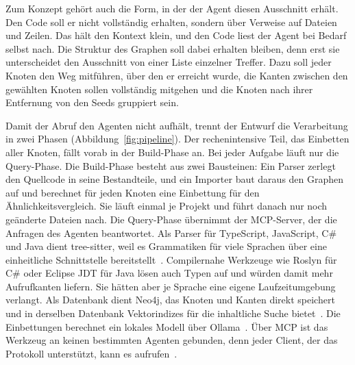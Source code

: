 Zum Konzept gehört auch die Form, in der der Agent diesen Ausschnitt erhält. Den Code soll er nicht vollständig erhalten, sondern über Verweise auf Dateien und Zeilen. Das hält den Kontext klein, und den Code liest der Agent bei Bedarf selbst nach. Die Struktur des Graphen soll dabei erhalten bleiben, denn erst sie unterscheidet den Ausschnitt von einer Liste einzelner Treffer. Dazu soll jeder Knoten den Weg mitführen, über den er erreicht wurde, die Kanten zwischen den gewählten Knoten sollen vollständig mitgehen und die Knoten nach ihrer Entfernung von den Seeds gruppiert sein.

Damit der Abruf den Agenten nicht aufhält, trennt der Entwurf die Verarbeitung in zwei Phasen (Abbildung~\ref{fig:pipeline}). Der rechenintensive Teil, das Einbetten aller Knoten, fällt vorab in der Build-Phase an. Bei jeder Aufgabe läuft nur die Query-Phase. Die Build-Phase besteht aus zwei Bausteinen: Ein Parser zerlegt den Quellcode in seine Bestandteile, und ein Importer baut daraus den Graphen auf und berechnet für jeden Knoten eine Einbettung für den Ähnlichkeitsvergleich. Sie läuft einmal je Projekt und führt danach nur noch geänderte Dateien nach. Die Query-Phase übernimmt der MCP-Server, der die Anfragen des Agenten beantwortet. Als Parser für TypeScript, JavaScript, C\# und Java dient tree-sitter, weil es Grammatiken für viele Sprachen über eine einheitliche Schnittstelle bereitstellt~\parencite{treesitter}. Compilernahe Werkzeuge wie Roslyn für C\# oder Eclipse JDT für Java lösen auch Typen auf und würden damit mehr Aufrufkanten liefern. Sie hätten aber je Sprache eine eigene Laufzeitumgebung verlangt. Als Datenbank dient Neo4j, das Knoten und Kanten direkt speichert und in derselben Datenbank Vektorindizes für die inhaltliche Suche bietet~\parencite{neo4jdocs,neo4jvector}. Die Einbettungen berechnet ein lokales Modell über Ollama~\parencite{ollama}. Über MCP ist das Werkzeug an keinen bestimmten Agenten gebunden, denn jeder Client, der das Protokoll unterstützt, kann es aufrufen~\parencite{anthropic2024mcp}.

